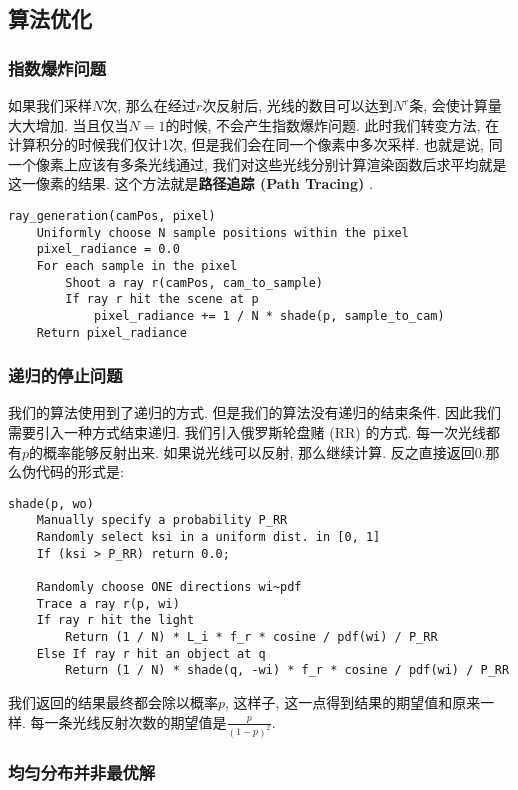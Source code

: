 \documentclass[openany]{progbookcn}
\begin{document}
\subsection{算法优化}

\subsubsection{指数爆炸问题}

如果我们采样$N$次, 那么在经过$r$次反射后, 光线的数目可以达到$N^r$条, 会使计算量大大增加. 当且仅当$N=1$的时候, 不会产生指数爆炸问题. 此时我们转变方法, 在计算积分的时候我们仅计1次, 但是我们会在同一个像素中多次采样. 也就是说, 同一个像素上应该有多条光线通过, 我们对这些光线分别计算渲染函数后求平均就是这一像素的结果. 这个方法就是\textbf{路径追踪 (Path Tracing) }. 

\begin{lstlisting}[caption=渲染函数解决指数爆炸伪代码]
ray_generation(camPos, pixel)
	Uniformly choose N sample positions within the pixel
	pixel_radiance = 0.0
	For each sample in the pixel
		Shoot a ray r(camPos, cam_to_sample)
		If ray r hit the scene at p
			pixel_radiance += 1 / N * shade(p, sample_to_cam)
	Return pixel_radiance
\end{lstlisting}

\subsubsection{递归的停止问题}
我们的算法使用到了递归的方式. 但是我们的算法没有递归的结束条件. 因此我们需要引入一种方式结束递归. 我们引入俄罗斯轮盘赌 (RR) 的方式. 每一次光线都有$p$的概率能够反射出来. 如果说光线可以反射, 那么继续计算. 反之直接返回0.那么伪代码的形式是: 

\begin{lstlisting}[caption=包含递归停止条件的渲染函数伪代码]
shade(p, wo)
	Manually specify a probability P_RR
	Randomly select ksi in a uniform dist. in [0, 1]
	If (ksi > P_RR) return 0.0;
	 
	Randomly choose ONE directions wi~pdf
	Trace a ray r(p, wi)
	If ray r hit the light
		Return (1 / N) * L_i * f_r * cosine / pdf(wi) / P_RR
	Else If ray r hit an object at q
		Return (1 / N) * shade(q, -wi) * f_r * cosine / pdf(wi) / P_RR
\end{lstlisting}

我们返回的结果最终都会除以概率$p$, 这样子, 这一点得到结果的期望值和原来一样. 每一条光线反射次数的期望值是$\frac{p}{(1-p)^2}$.

\subsubsection{均匀分布并非最优解}
\end{document}

